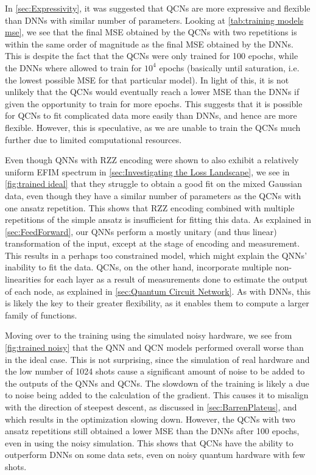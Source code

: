In \autoref{sec:Expressivity}, it was suggested that QCNs are more expressive and flexible than DNNs with similar number of parameters. Looking at \autoref{tab:training models mse}, we see that the final MSE obtained by the QCNs with two repetitions is within the same order of magnitude as the final MSE obtained by the DNNs. This is despite the fact that the QCNs were only trained for 100 epochs, while the DNNs where allowed to train for $10^4$ epochs (basically until saturation, i.e. the lowest possible MSE for that particular model). In light of this, it is not unlikely that the QCNs would eventually reach a lower MSE than the DNNs if given the opportunity to train for more epochs. This suggests that it is possible for QCNs to fit complicated data more easily than DNNs, and hence are more flexible. However, this is speculative, as we are unable to train the QCNs much further due to limited computational resources.    

Even though QNNs with RZZ encoding were shown to also exhibit a relatively uniform EFIM spectrum in \autoref{sec:Investigating the Loss Landscape}, we see in \autoref{fig:trained ideal} that they struggle to obtain a good fit on the mixed Gaussian data, even though they have a similar number of parameters as the QCNs with one ansatz repetition. This shows that RZZ encoding combined with multiple repetitions of the simple ansatz is insufficient for fitting this data. As explained in \autoref{sec:FeedForward}, our QNNs perform a mostly unitary (and thus linear) transformation of the input, except at the stage of encoding and measurement. This results in a perhaps too constrained model, which might explain the QNNs' inability to fit the data. QCNs, on the other hand, incorporate multiple non-linearities for each layer as a result of measurements done to estimate the output of each node, as explained in \autoref{sec:Quantum Circuit Network}. As with DNNs, this is likely the key to their greater flexibility, as it enables them to compute a larger family of functions. 

Moving over to the training using the simulated noisy hardware, we see from \autoref{fig:trained noisy} that the QNN and QCN models performed overall worse than in the ideal case. This is not surprising, since the simulation of real hardware and the low number of 1024 shots cause a significant amount of noise to be added to the outputs of the QNNs and QCNs. The slowdown of the training is likely a due to noise being added to the calculation of the gradient. This causes it to misalign with the direction of steepest descent, as discussed in \autoref{sec:BarrenPlateus}, and which results in the optimization slowing down. However, the QCNs with two ansatz repetitions still obtained a lower MSE than the DNNs after 100 epochs, even in using the noisy simulation. This shows that QCNs have the ability to outperform DNNs on some data sets, even on noisy quantum hardware with few shots. 



